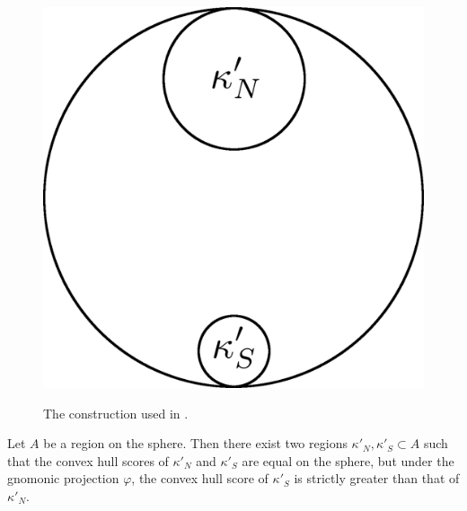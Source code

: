 \begin{figure}
	\centering
	\includegraphics[width=.4\textwidth]{figs/differentkappa}\\[1.5em]
	\caption{ The construction used in . }
	\label{fig:caphr}
\end{figure}

\begin{theorem}
	\label{thm:convhull}
	Let $A$ be a region on the sphere.  Then there exist two regions $\kappa'_N,\kappa'_S\subset A$ such that the convex hull scores of $\kappa'_N$ and $\kappa'_S$ are equal on the sphere, but under the gnomonic projection $\varphi$, the convex hull score of $\kappa'_S$ is strictly greater than that of $\kappa'_N$. 
\end{theorem}

